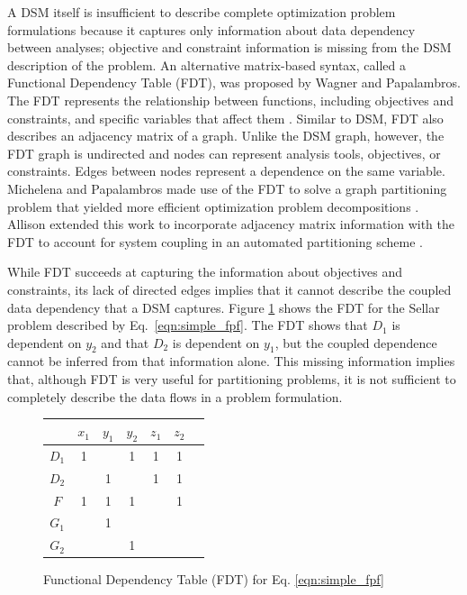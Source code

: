     A DSM itself is insufficient to describe complete optimization problem formulations because it 
    captures only information about data dependency between analyses; objective and 
    constraint information is missing from the DSM description of the problem. 
    An alternative matrix-based syntax, called a Functional Dependency Table (FDT), was proposed by Wagner and Papalambros. 
    The FDT represents the relationship between functions, including objectives and constraints, and specific variables that affect 
    them \cite{Wagner1993}. Similar to DSM, FDT also describes an adjacency matrix of a graph. Unlike the DSM graph, 
    however, the FDT graph is undirected and nodes can represent analysis tools, objectives, 
    or constraints. Edges between nodes represent a dependence on the same 
    variable. Michelena and Papalambros made use of the FDT to solve a graph partitioning problem that yielded 
    more efficient optimization problem decompositions \cite{Michelena1997}. Allison 
    extended this work to incorporate adjacency matrix information with the FDT to 
    account for system coupling in an automated partitioning scheme \cite{Allison2008}. 

    While FDT succeeds at capturing the 
    information about objectives and constraints, its lack of directed edges 
    implies that it cannot describe the coupled data dependency that a DSM captures. 
    Figure \ref{fig:FDT_simple}  shows the FDT for the Sellar problem described by Eq.~\ref{eqn:simple_fpf}.
    The FDT shows that $D_1$ is dependent on $y_2$ and 
    that $D_2$ is dependent on $y_1$, but the coupled dependence cannot be inferred from 
    that information alone. This missing information implies 
    that, although FDT is very useful for partitioning problems, it is not 
    sufficient to completely describe the data flows in a problem formulation. 

    \begin{figure}[htb!]
        \begin{center}
        \begin{tabular}{|c|c|c|c|c|c|c|}
            \hline
                   & $x_1$ & $y_1$ & $y_2$ & $z_1$ & $z_2$ \\ \hline
            $D_1$  & 1     &       & 1     & 1     & 1     \\ \hline
            $D_2$  &       & 1     &       & 1     & 1     \\ \hline
            $F$    & 1     & 1     & 1     &       & 1     \\ \hline
            $G_1$  &       & 1     &       &       &       \\ \hline
            $G_2$  &       &       & 1     &       &       \\
            \hline
        \end{tabular}
        \caption{Functional Dependency Table (FDT) for Eq. \ref{eqn:simple_fpf} \label{fig:FDT_simple}}
        \end{center}
    \end{figure}

